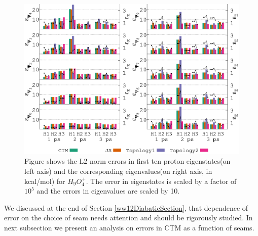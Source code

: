 \begin{figure}[H]
  \begin{center}
    \includegraphics[width=1\textwidth]{figures/eigenEvalEditted.eps}
    \caption{\label{chap3fig6} Figure shows the L2 norm errors in first ten proton eigenstates(on left axis) and
    the corresponding eigenvalues(on right axis, in kcal/mol) for $H_9O_4^+$. The error in eigenstates is scaled
    by a factor of $10^5$ and the errors in eigenvalues are scaled by 10.}
  \end{center}
\end{figure}

We discussed at the end of Section \ref{ww12DiabaticSection}, that dependence of error on the choice of seam
needs attention and should be rigorously studied. In next subsection we present an analysis on errors in CTM as a
function of seams.

